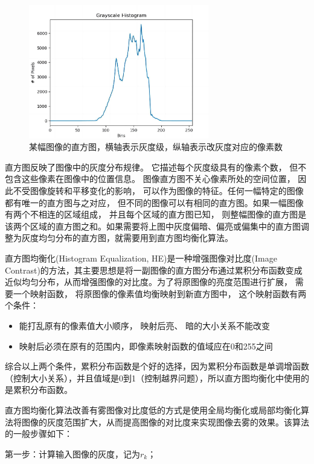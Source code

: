 \documentclass[12pt]{article}
\begin{document}
\begin{figure}[h]
    \centering
    \includegraphics[width=0.7\textwidth]{pic/pic1.jpg}
    \caption{某幅图像的直方图，横轴表示灰度级，纵轴表示改灰度对应的像素数}
\end{figure}

直方图反映了图像中的灰度分布规律。 它描述每个灰度级具有的像素个数， 但不包含这些像素在图像中的位置信息。 图像直方图不关心像素所处的空间位置， 因此不受图像旋转和平移变化的影响， 可以作为图像的特征。任何一幅特定的图像都有唯一的直方图与之对应， 但不同的图像可以有相同的直方图。如果一幅图像有两个不相连的区域组成， 并且每个区域的直方图已知， 则整幅图像的直方图是该两个区域的直方图之和。如果需要将上图中灰度偏暗、偏亮或偏集中的直方图调整为灰度均匀分布的直方图，就需要用到直方图均衡化算法。

直方图均衡化(Histogram Equalization, HE)是一种增强图像对比度(Image Contrast)的方法，其主要思想是将一副图像的直方图分布通过累积分布函数变成近似均匀分布，从而增强图像的对比度。为了将原图像的亮度范围进行扩展， 需要一个映射函数， 将原图像的像素值均衡映射到新直方图中， 这个映射函数有两个条件：
\begin{itemize}
    \item 能打乱原有的像素值大小顺序， 映射后亮、 暗的大小关系不能改变
    \item 映射后必须在原有的范围内，即像素映射函数的值域应在0和255之间
\end{itemize}

综合以上两个条件，累积分布函数是个好的选择，因为累积分布函数是单调增函数（控制大小关系），并且值域是0到1（控制越界问题），所以直方图均衡化中使用的是累积分布函数。

直方图均衡化算法改善有雾图像对比度低的方式是使用全局均衡化或局部均衡化算法将图像的灰度范围扩大，从而提高图像的对比度来实现图像去雾的效果。该算法的一般步骤如下：

第一步：计算输入图像的灰度，记为$r_k$；
\end{document}
